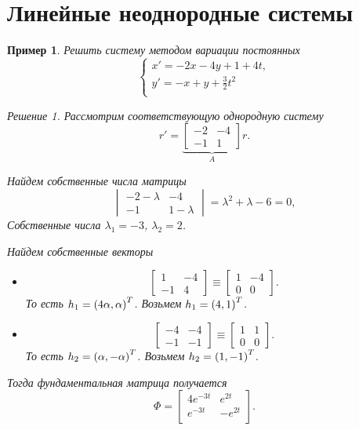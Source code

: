 \documentclass[a5paper, 11pt]{article}
\theoremstyle{definition}
\theoremstyle{plain}
\newtheorem{Ex}{Пример}
\theoremstyle{remark}
\newtheorem*{Solution}{Решение}
\begin{document}
	\section[17.02.2023]{Линейные неоднородные системы}
	\begin{Ex}
		Решить систему методом вариации постоянных
		\[
		\begin{cases}
			x' = -2x -4y+1+4t, \\
			y' = -x + y + \frac32 t^2\\
		\end{cases}
		\]
		\begin{Solution}
			Рассмотрим соответствующую однородную систему 
			\[
			r' = \underbrace{\begin{bmatrix}
				-2 & -4 \\
				-1 & 1
			\end{bmatrix}}_A r.
			\]
			
			Найдем собственные числа матрицы
			\[
			\begin{vmatrix}
				-2-\lambda & -4 \\
				-1 & 1-\lambda 
			\end{vmatrix} = \lambda^2 +\lambda-6 = 0,
			\]
			Собственные числа $\lambda_1= -3$, $\lambda_2 = 2$.
			
			Найдем собственные векторы
			\begin{itemize}
				\item[$\lambda_1 = -3$] \[
				\begin{bmatrix}
					1 & -4 \\
					-1 & 4 
				\end{bmatrix} \equiv \begin{bmatrix}
				1 & -4 \\
				0 & 0
			\end{bmatrix}.
			\]
			То есть $h_1 = \left(4\alpha, \alpha\right)^T$. Возьмем $h_1 = \left(4,1\right)^T$.
			
				\item[$\lambda_1 = 2$] \[
			\begin{bmatrix}
				-4 & -4 \\
				-1 & -1 
			\end{bmatrix} \equiv \begin{bmatrix}
				1 & 1\\
				0 & 0
			\end{bmatrix}.
			\]
			То есть $h_2 = \left(\alpha, -\alpha\right)^T$. Возьмем $h_2 = \left(1,-1\right)^T$.
			\end{itemize}
		
			Тогда фундаментальная матрица получается 
			\[
			\Phi = \begin{bmatrix}
				4e^{-3t} & e^{2t} \\
				e^{-3t} & -e^{2t} \\
			\end{bmatrix}.
			\]
			

\end{Solution}
\end{Ex}
\end{document}
